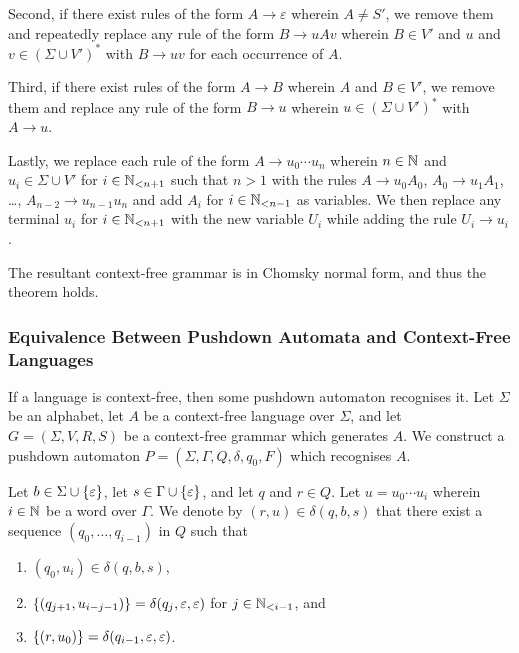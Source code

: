   Second, if there exist rules of the form \(A \to \varepsilon\) wherein \(A \neq S'\), we remove them and repeatedly
  replace any rule of the form \(B \to u A v\) wherein \(B \in V'\) and \(u\) and \(v \in (\Sigma \cup V')^*\) with
  \(B \to u v\) for each occurrence of \(A\).

  Third, if there exist rules of the form \(A \to B\) wherein \(A\) and \(B \in V'\), we remove them and replace any
  rule of the form \(B \to u\) wherein \(u \in (\Sigma \cup V')^*\) with \(A \to u\).

  Lastly, we replace each rule of the form \(A \to u_0 \cdots u_n\) wherein \(n \in \setnat\) and \(u_i \in \Sigma
  \cup V'\) for \(i \in \Nln[n + 1]\) such that \(n > 1\) with the rules \(A \to u_0 A_0\), \(A_0 \to u_1 A_1\), \ldots,
  \(A_{n - 2} \to u_{n - 1} u_n\) and add \(A_i\) for \(i \in \Nln[n - 1]\) as variables. We then replace any terminal
  \(u_i\) for \(i \in \Nln[n + 1]\) with the new variable \(U_i\) while adding the rule \(U_i \to u_i\).

  The resultant context-free grammar is in Chomsky normal form, and thus the theorem holds.
\Epr

\subsubsection{Equivalence Between Pushdown Automata and Context-Free Languages}

\Blm
  \label{lem3}
  If a language is context-free, then some pushdown automaton recognises it.
\Elm
\Bpr
  Let \(\Sigma\) be an alphabet, let \(A\) be a context-free language over \(\Sigma\), and let \(G = (\Sigma, V, R, S)\)
  be a context-free grammar which generates \(A\).  We construct a pushdown automaton \(P = (\Sigma, \Gamma, Q, \delta,
  q_0, F)\) which recognises \(A\).

  Let \(b \in \Sigma \cup \set{\varepsilon}\), let \(s \in \Gamma \cup \set{\varepsilon}\), and let \(q\) and
  \(r \in Q\). Let \(u = u_0 \cdots u_i\) wherein \(i \in \setnat\) be a word over \(\Gamma\). We denote by \((r, u)
  \in \delta(q, b, s)\) that there exist a sequence \((q_0, \ldots, q_{i - 1})\) in \(Q\) such that
  \begin{enumerate}
    \item \((q_0, u_i) \in \delta(q, b, s)\),
    \item \(\set{(q_{j + 1}, u_{i - j - 1})} = \delta(q_j, \varepsilon, \varepsilon)\) for \(j \in \Nln[i - 1]\), and
    \item \(\set{(r, u_0)} = \delta(q_{i - 1}, \varepsilon, \varepsilon)\).
  \end{enumerate}

